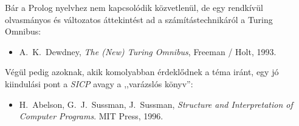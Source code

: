 Bár a Prolog nyelvhez nem kapcsolódik közvetlenül, de egy rendkívül
olvasmányos és változatos áttekintést ad a számítástechnikáról a
Turing Omnibus:
\begin{itemize}[leftmargin=1.5cm,itemindent=-1cm,labelsep=0cm]
\item[] A.~K.~Dewdney, \emph{The (New) Turing Omnibus}, Freeman / Holt, 1993.
\end{itemize}
Végül pedig azoknak, akik komolyabban érdeklődnek a téma iránt, egy jó
kiindulási pont a \emph{SICP} avagy a ,,varázslós könyv'':
\begin{itemize}[leftmargin=1.5cm,itemindent=-1cm,labelsep=0cm]
\item[] H.~Abelson, G.~J.~Sussman, J.~Sussman, \emph{Structure and Interpretation of Computer Programs}. MIT Press, 1996.
\end{itemize}
